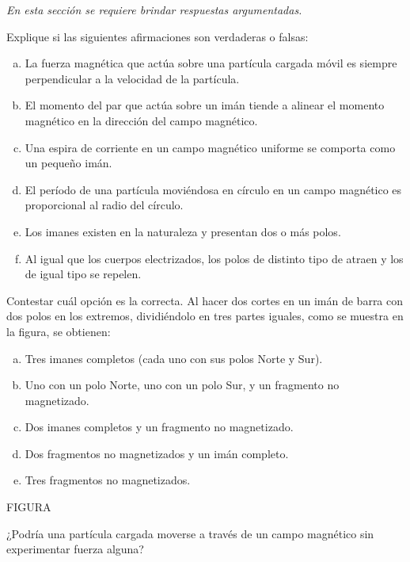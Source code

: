 \textit{En esta sección se requiere brindar respuestas argumentadas.}
\setcounter{figure}{0}
%
\begin{Exercise}
    Explique si las siguientes afirmaciones son verdaderas o falsas:
    \begin{enumerate}[a)]
        \item La fuerza magnética que actúa sobre una partícula cargada móvil es siempre perpendicular a la velocidad de la partícula.
        \item El momento del par que actúa sobre un imán tiende a alinear el momento magnético en la dirección del campo magnético.
        \item Una espira de corriente en un campo magnético uniforme se comporta como un pequeño imán.
        \item El período de una partícula moviéndosa en círculo en un campo magnético es proporcional al radio del círculo.
        \item Los imanes existen en la naturaleza y presentan dos o más polos.
        \item Al igual que los cuerpos electrizados, los polos de distinto tipo de atraen y los de igual tipo se repelen.
    \end{enumerate}
\end{Exercise}
%
\begin{Exercise}
    Contestar cuál opción es la correcta. Al hacer dos cortes en un imán de barra con dos polos en los extremos, dividiéndolo en tres partes iguales, como se muestra en la figura, se obtienen:
    \begin{enumerate}[a)]
        \item Tres imanes completos (cada uno con sus polos Norte y Sur).
        \item Uno con un polo Norte, uno con un polo Sur, y un fragmento no magnetizado.
        \item Dos imanes completos y un fragmento no magnetizado.
        \item Dos fragmentos no magnetizados y un imán completo.
        \item Tres fragmentos no magnetizados.
    \end{enumerate}
FIGURA
\end{Exercise}
%
\begin{Exercise}
    ¿Podría una partícula cargada moverse a través de un campo magnético sin experimentar fuerza alguna?
\end{Exercise}
